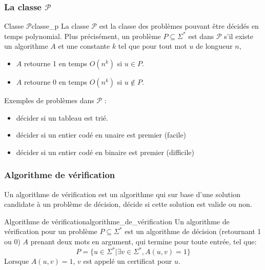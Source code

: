 \subsubsection{La classe $\mathcal{P}$}
\label{sub:la_classe_p}
\begin{definition}{Classe $\mathcal{P}$}{classe_p}
    La classe $\mathcal{P}$ est la classe des problèmes pouvant être décidés en temps polynomial. Plus précisément,
    un problème $P\subseteq\Sigma^*$ est dans $\mathcal{P}$ s'il existe un algorithme $A$ et une constante $k$ tel que
    pour tout mot $u$ de longueur $n$,
    \begin{itemize}[label=\textbullet]
        \item $A$ retourne 1 en temps $O(n^k)$ si $u\in P$.
        \item $A$ retourne 0 en temps $O(n^k)$ si $u\notin P$.
    \end{itemize}
\end{definition}
\begin{example}
    Exemples de problèmes dans $\mathcal{P}$ :
    \begin{itemize}[label=\textbullet]
        \item décider si un tableau est trié.
        \item décider si un entier codé en unaire est premier (facile)
        \item décider si un entier codé en binaire est premier (difficile)
    \end{itemize}
\end{example}


\subsubsection{Algorithme de vérification}
\label{sub:algorithme_de_verification}
Un algorithme de vérification est un algorithme qui sur base d'une solution candidate à un problème de décision, décide si
cette solution est valide ou non.
\begin{definition}{Algorithme de vérification}{algorithme_de_vérification}
    Un algorithme de vérification pour un problème $P\subseteq\Sigma^*$ est un algorithme de décision (retournant 1 ou 0)
    $A$ prenant deux mots en argument, qui termine pour toute entrée, tel que:
    \begin{equation*}
        P = \{u\in\Sigma^* | \exists v \in \Sigma^*, A(u,v)=1\}
    \end{equation*}
    Lorsque $A(u,v)=1$, $v$ est appelé un certificat pour $u$.
\end{definition}

